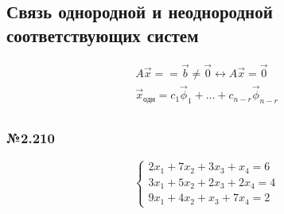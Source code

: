 \documentclass{article}
\begin{document}
\subsection{Связь однородной и неоднородной \\
соответствующих систем}

\begin{gather*}
	A \vec{x} = =\vec{b} \ne \vec{0} \leftrightarrow A \vec{x} = \vec{0} \\
	\vec{x}_{\text{одн}} = c_1 \vec{\phi}_1 + \dots + c_{n-r} \vec{\phi}_{n-r} \\ 
\end{gather*}

\subsubsection*{№2.210}

\[
	\begin{cases}
		2x_1 + 7x_2 + 3x_3 + x_4 = 6 \\
		3x_1 + 5x_2 + 2x_3 + 2x_4 = 4 \\
		9x_1 + 4x_2 + x_3 + 7x_4 = 2
	\end{cases}
\]
\end{document}
